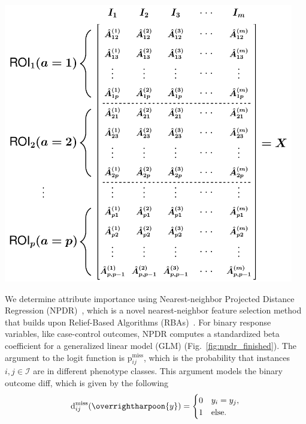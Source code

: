 \documentclass[10pt,letterpaper]{article}\usepackage[]{graphicx}\usepackage[]{color}
\begin{document}
\begin{minipage}[c]{0.7\textwidth}\hspace{-0.6cm}
	\includegraphics[width=0.95\textwidth]{fig5_rs_fmri_all_instance_matrix.pdf}
\end{minipage}\hspace{-0.8cm}
\begin{minipage}[c]{0.3\textwidth}
	\captionsetup{type=figure}\label{fig:rs-fMRI_matrix}
\end{minipage}

\bigskip

We determine attribute importance using Nearest-neighbor Projected Distance Regression (NPDR)~\cite{npdr}, which is a novel nearest-neighbor feature selection method that builds upon Relief-Based Algorithms (RBAs)~\cite{robnik2003,urbanowicz17}. For binary response variables, like case-control outcomes, NPDR computes a standardized beta coefficient for a generalized linear model (GLM) (Fig.~\ref{fig:npdr_finished}). The argument to the logit function is $\text{p}^\text{miss}_{ij}$, which is the probability that instances $i,j \in \mathcal{I}$ are in different phenotype classes. This argument models the binary outcome diff, which is given by the following
%
\begin{equation}\label{eq:diff_outcome}
\text{d}^\text{miss}_{ij}(\overrightharpoon{y})=\begin{cases}
0 & y_i = y_j, \\
1 & \text{else}.
\end{cases}
\end{equation}
\end{document}
